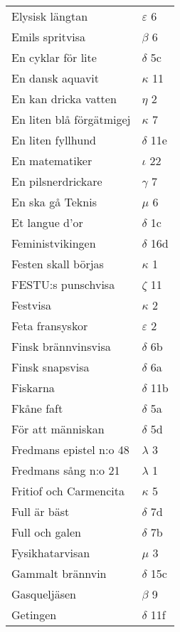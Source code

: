 \documentclass[a6paper,10pt]{article}
\begin{document}
\newpage
\setlength{\oddsidemargin}{-0.47in}
\begin{table}[!h]
\begin{tabular}{l l}
Elysisk längtan&$\varepsilon$ 6\\
Emils spritvisa&$\beta$ 6\\
En cyklar för lite&	$\delta$ 5c\\
En dansk aquavit&$\kappa$ 11\\
En kan dricka vatten&	$\eta$ 2\\
En liten blå förgätmigej&$\kappa$ 7\\
En liten fyllhund&$\delta$ 11e\\
En matematiker&$\iota$ 22\\
En pilsnerdrickare&$\gamma$ 7\\
En ska gå Teknis&	$\mu$ 6\\
Et langue d'or&$\delta$ 1c\\
Feministvikingen&$\delta$ 16d\\
Festen skall börjas&$\kappa$ 1\\
FESTU:s punschvisa&$\zeta$ 11\\
Festvisa&$\kappa$ 2\\
Feta fransyskor&$\varepsilon$ 2\\
Finsk brännvinsvisa&$\delta$ 6b\\
Finsk snapsvisa&$\delta$ 6a\\
Fiskarna&$\delta$ 11b\\
Fkåne faft&$\delta$ 5a\\
För att människan&$\delta$ 5d\\
Fredmans epistel n:o 48	&$\lambda$ 3\\
Fredmans sång n:o 21&$\lambda$ 1\\
Fritiof och Carmencita&$\kappa$ 5\\
Full är bäst&$\delta$ 7d\\
Full och galen&$\delta$ 7b\\
Fysikhatarvisan&$\mu$ 3\\
Gammalt brännvin&$\delta$ 15c\\
Gasqueljäsen&$\beta$ 9\\
Getingen&$\delta$ 11f\\
\end{tabular}
\end{table}
\end{document}
